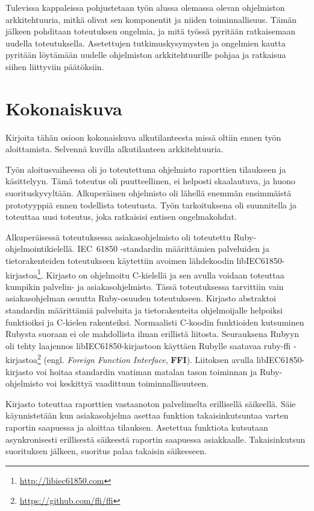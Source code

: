 Tulevissa kappaleissa pohjustetaan työn alussa olemassa olevan ohjelmiston arkkitehtuuria, mitkä olivat sen komponentit ja niiden toiminnallisuus. Tämän jälkeen pohditaan toteutuksen ongelmia, ja mitä työssä pyritään ratkaisemaan uudella toteutuksella. Asetettujen tutkimuskysymysten ja ongelmien kautta pyritään löytämään uudelle ohjelmiston arkkitehtuurille pohjaa ja ratkaisua siihen liittyviin päätöksiin.

\section{Kokonaiskuva}
\begin{it}
	Kirjoita tähän osioon kokonaiskuva alkutilanteesta missä oltiin ennen työn aloittamista. Selvennä kuvilla alkutilanteen arkkitehtuuria.
\end{it}

Työn aloitusvaiheessa oli jo toteutettuna ohjelmisto raporttien tilaukseen ja käsittelyyn. Tämä toteutus oli puutteellinen, ei helposti skaalautuva, ja huono suorituskyvyltään. Alkuperäinen ohjelmisto oli lähellä enemmän ensimmäistä prototyyppiä ennen todellista toteutusta. Työn tarkoituksena oli suunnitella ja toteuttaa uusi toteutus, joka ratkaisisi entisen ongelmakohdat.

Alkuperäisessä toteutuksessa asiakasohjelmisto oli toteutettu Ruby-ohjelmointikielellä. IEC~61850 -standardin määrittämien palveluiden ja tietorakenteiden toteutukseen käytettiin avoimen lähdekoodin libIEC61850-kirjastoa\footnote{\url{http://libiec61850.com}}. Kirjasto on ohjelmoitu C-kielellä ja sen avulla voidaan toteuttaa kumpikin palvelin- ja asiakasohjelmisto. Tässä toteutuksessa tarvittiin vain asiakasohjelman osuutta Ruby-osuuden toteutukseen. Kirjasto abstraktoi standardin määrittämiä palveluita ja tietorakenteita ohjelmoijalle helpoiksi funktioiksi ja C-kielen rakenteiksi. Normaalisti C-koodin funktioiden kutsuminen Rubysta suoraan ei ole mahdollista ilman erillistä liitosta. Seurauksena Rubyyn oli tehty laajennos libIEC61850-kirjastoon käyttäen Rubylle saatavaa ruby-ffi -kirjastoa\footnote{\url{https://github.com/ffi/ffi}} (engl. \emph{Foreign Function Interface}, \textbf{FFI}). Liitoksen avulla libIEC61850-kirjasto voi hoitaa standardin vaatiman matalan tason toiminnan ja Ruby-ohjelmisto voi keskittyä vaadittuun toiminnallisuuteen.

Kirjasto toteuttaa raporttien vastaanoton palvelimelta erillisellä säikeellä. Säie käynnistetään kun asiakasohjelma asettaa funktion takaisinkutsuntaa varten raportin saapuessa ja aloittaa tilauksen. Asetettua funktiota kutsutaan asynkronisesti erillisestä säikeestä raportin saapuessa asiakkaalle. Takaisinkutsun suorituksen jälkeen, suoritus palaa takaisin säikeeseen.


